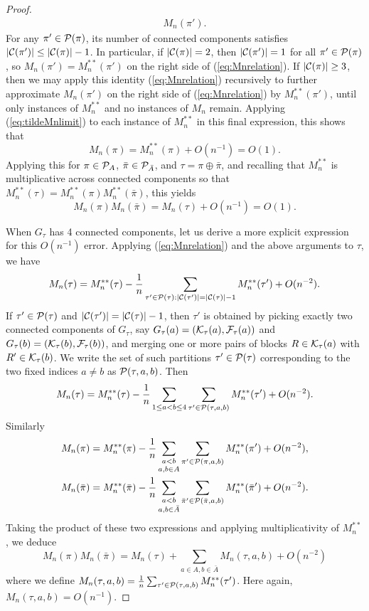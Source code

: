 \documentclass[10pt,reqno]{amsart}
\begin{document}
\begin{proof}
\begin{align}
M_n(\pi').\label{eq:Mnrelation}
\end{align}
For any $\pi' \in \mathcal{P}(\pi)$, its number of connected components
satisfies $|\mathcal{C}(\pi')| \leq |\mathcal{C}(\pi)|-1$. In particular, if $|\mathcal{C}(\pi)|=2$,
then $|\mathcal{C}(\pi')|=1$ for all $\pi' \in \mathcal{P}(\pi)$, so $M_n(\pi')=M_n^{**}(\pi')$
on the right side of (\ref{eq:Mnrelation}).
If $|\mathcal{C}(\pi)| \geq 3$, then we may apply this identity (\ref{eq:Mnrelation})
recursively to further approximate $M_n(\pi')$ on the right
side of (\ref{eq:Mnrelation}) by $M_n^{**}(\pi')$, until only instances of
$M_n^{**}$ and no instances of $M_n$ remain.
Applying (\ref{eq:tildeMnlimit}) to each instance of $M_n^{**}$ in
this final expression, this shows that
\[M_n(\pi)=M_n^{**}(\pi)+O(n^{-1})=O(1).\]
Applying this for $\pi \in \mathcal{P}_A$, $\bar\pi \in \mathcal{P}_{\bar A}$, and $\tau=\pi
\oplus \bar\pi$, and recalling that
$M_n^{**}$ is multiplicative across connected components so that
$M_n^{**}(\tau)=M_n^{**}(\pi)M_n^{**}(\bar\pi)$, this yields
\begin{equation}\label{eq:Mnapprox1}
M_n(\pi)M_n(\bar\pi)=M_n(\tau)+O(n^{-1})=O(1).
\end{equation}

When $G_\tau$ has 4 connected components, let us derive a more explicit
expression for this $O(n^{-1})$ error. Applying (\ref{eq:Mnrelation}) and the
above arguments to $\tau$, we have
\[M_n(\tau)=M_n^{**}(\tau)
-\frac{1}{n}\sum_{\tau' \in \mathcal{P}(\tau):|\mathcal{C}(\tau')|=|\mathcal{C}(\tau)|-1}
M_n^{**}(\tau')+O(n^{-2}).\]
If $\tau' \in \mathcal{P}(\tau)$ and $|\mathcal{C}(\tau')|=|\mathcal{C}(\tau)|-1$, then $\tau'$ is
obtained by picking exactly two connected components of $G_\tau$, say
$G_\tau(a)=(\mathcal{K}_\tau(a),\mathcal{F}_\tau(a))$ and $G_\tau(b)=(\mathcal{K}_\tau(b),\mathcal{F}_\tau(b))$,
and merging one or more pairs of blocks $R \in \mathcal{K}_\tau(a)$ with $R' \in
\mathcal{K}_\tau(b)$. We write the set of such partitions $\tau' \in \mathcal{P}(\tau)$
corresponding to the two fixed indices $a \neq b$ as $\mathcal{P}(\tau,a,b)$. Then
\[M_n(\tau)=M_n^{**}(\tau)
-\frac{1}{n}\sum_{1 \leq a<b \leq 4} \sum_{\tau' \in \mathcal{P}(\tau,a,b)}
M_n^{**}(\tau')+O(n^{-2}).\]
Similarly
\begin{align*}
M_n(\pi)&=M_n^{**}(\pi)
-\frac{1}{n}\mathop{\sum_{a<b}}_{a,b \in A} \sum_{\pi' \in \mathcal{P}(\pi,a,b)}
M_n^{**}(\pi')+O(n^{-2}),\\
M_n(\bar\pi)&=M_n^{**}(\bar\pi)
-\frac{1}{n}\mathop{\sum_{a<b}}_{a,b \in \bar A} \sum_{\bar\pi' \in \mathcal{P}(\bar\pi,a,b)}
M_n^{**}(\bar\pi')+O(n^{-2}).
\end{align*}
Taking the product of these two expressions and applying multiplicativity of
$M_n^{**}$, we deduce
\begin{equation}\label{eq:Mnapprox2}
M_n(\pi)M_n(\bar\pi)=M_n(\tau)+\sum_{a \in A,b \in \bar A}
M_n(\tau,a,b)+O(n^{-2})
\end{equation}
where we define
$M_n(\tau,a,b)=\frac{1}{n}\sum_{\tau' \in \mathcal{P}(\tau,a,b)} M_n^{**}(\tau')$.
Here again, $M_n(\tau,a,b)=O(n^{-1})$.


\end{proof}
\end{document}
